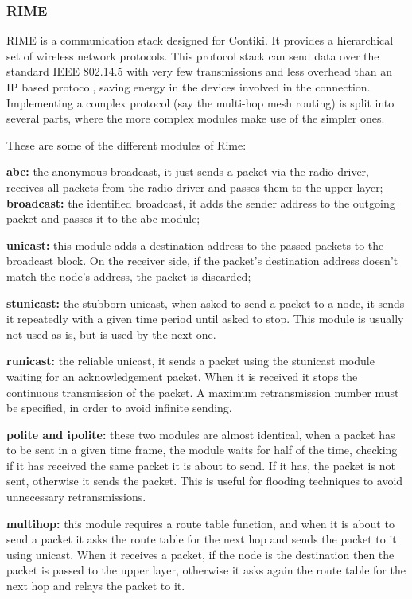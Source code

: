 \subsubsection{RIME}

RIME is a communication stack designed for Contiki.
It provides a hierarchical set of wireless network protocols.
This protocol stack can send data over the standard IEEE 802.14.5 with very few transmissions and less overhead than an IP based protocol,
	saving energy in the devices involved in the connection.
Implementing a complex protocol (say the multi-hop mesh routing) is split into several parts,
	where the more complex modules make use of the simpler ones.


These are some of the different modules of Rime:

\textbf{abc:} the anonymous broadcast,
	it just sends a packet via the radio driver,
	receives all packets from the radio driver and passes them to the upper layer; 
\textbf{broadcast:} the identified broadcast, it adds the sender address to the outgoing
packet and passes it to the abc module;

\textbf{unicast:} this module adds a destination address to the passed packets to the broadcast block.
On the receiver side,
	if the packet's destination address doesn't match the node's address, the packet is discarded;

\textbf{stunicast:} the stubborn unicast,
	when asked to send a packet to a node,
	it sends it repeatedly with a given time period until asked to stop.
This module is usually not used as is,
	but is used by the next one.

\textbf{runicast:} the reliable unicast,
	it sends a packet using the stunicast module waiting for an acknowledgement packet.
When it is received it stops the continuous transmission of the packet.
A maximum retransmission number must be specified,
	in order to avoid infinite sending.

\textbf{polite and ipolite:} these two modules are almost identical,
	when a packet has to be sent in a given time frame,
	the module waits for half of the time,
	checking if it has received the same packet it is about to send.
If it has,
	the packet is not sent,
	otherwise it sends the packet.
This is useful for flooding techniques to avoid unnecessary retransmissions.

\textbf{multihop:} this module requires a route table function,
	and when it is about to send a packet it asks the route table for the next hop and sends the packet to it using unicast.
When it receives a packet,
	if the node is the destination then the packet is passed to the upper layer,
	otherwise it asks again the route table for the next hop and relays the packet to it.

